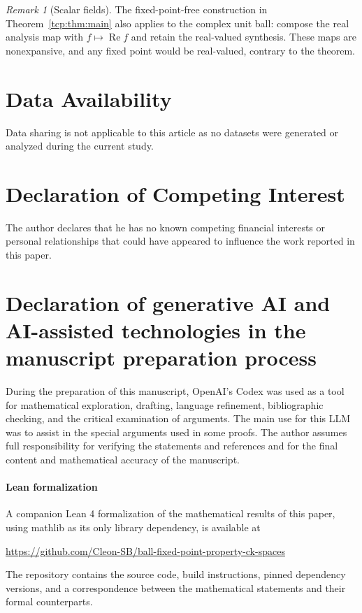 \documentclass[preprint,12pt,nopreprintline]{elsarticle}
\theoremstyle{definition}
\theoremstyle{remark}
\newtheorem{remark}[theorem]{Remark}
\numberwithin{equation}{section}
\begin{document}
\begin{remark}[Scalar fields]
The fixed-point-free construction in Theorem~\ref{tcp:thm:main} also applies to the complex unit ball: compose the real analysis
map with $f\mapsto\operatorname{Re}f$ and retain the real-valued synthesis. These maps are nonexpansive, and any fixed point would
be real-valued, contrary to the theorem.
\end{remark}


\section*{Data Availability}
Data sharing is not applicable to this article as no datasets were generated or analyzed during the current study.

\section*{Declaration of Competing Interest}
The author declares that he has no known competing financial interests or personal relationships that could have appeared to influence the work reported in this paper.

\section*{Declaration of generative AI and AI-assisted technologies in the manuscript preparation process}

During the preparation of this manuscript, OpenAI's Codex was used as a tool for mathematical exploration, drafting, language refinement, bibliographic checking, and the critical examination of arguments. The main use for this LLM was to assist in the special arguments used in some proofs. The author assumes full responsibility for verifying the statements and references and for the final content and mathematical accuracy of the manuscript.

\paragraph{Lean formalization}
A companion Lean 4 formalization of the mathematical results of this paper, using mathlib as its only library dependency,
is available at
\begin{center}
\url{https://github.com/Cleon-SB/ball-fixed-point-property-ck-spaces}
\end{center}
The repository contains the source code, build instructions, pinned dependency versions, and a correspondence between the
mathematical statements and their formal counterparts.
\end{document}

